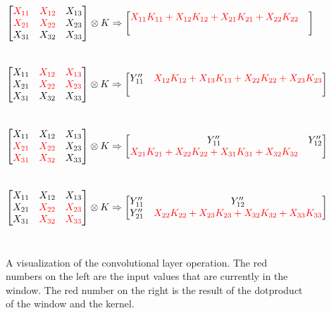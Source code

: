 \begin{figure}
    \centering
    $$\begin{bmatrix}
        \color{red} X_{11} & \color{red} X_{12} & X_{13} \\
        \color{red} X_{21} & \color{red} X_{22} & X_{23} \\
        X_{31} & X_{32} & X_{33} 
    \end{bmatrix} \otimes K \Rightarrow \begin{bmatrix}
        \color{red} X_{11} K_{11} + X_{12} K_{12} + X_{21} K_{21} + X_{22} K_{22} & \\
         &
    \end{bmatrix}$$\\
    $$\begin{bmatrix}
        X_{11} & \color{red} X_{12} & \color{red} X_{13} \\
        X_{21} & \color{red} X_{22} & \color{red} X_{23} \\
        X_{31} & X_{32} & X_{33} 
    \end{bmatrix} \otimes K \Rightarrow \begin{bmatrix}
         Y''_{11} &\color{red} X_{12} K_{12} + X_{13} K_{13} + X_{22} K_{22} + X_{23} K_{23} \\
         &
    \end{bmatrix}$$\\
    $$\begin{bmatrix}
        X_{11} & X_{12} & X_{13} \\
        \color{red} X_{21} & \color{red} X_{22} & X_{23} \\
        \color{red} X_{31} & \color{red} X_{32} & X_{33}
    \end{bmatrix} \otimes K \Rightarrow \begin{bmatrix}
        Y''_{11} & Y''_{12} \\
        \color{red} X_{21} K_{21} + X_{22} K_{22} + X_{31} K_{31} + X_{32} K_{32} & 
    \end{bmatrix}$$\\
    $$\begin{bmatrix}
        X_{11} & X_{12} & X_{13} \\
        X_{21} & \color{red} X_{22} & \color{red} X_{23} \\
        X_{31} & \color{red} X_{32} & \color{red} X_{33}
    \end{bmatrix} \otimes K \Rightarrow \begin{bmatrix}
         Y''_{11} & Y''_{12} \\
         Y''_{21} & \color{red} X_{22} K_{22} + X_{23} K_{23} + X_{32} K_{32} + X_{33} K_{33}
    \end{bmatrix}$$\\
    \caption{A visualization of the convolutional layer operation. The red numbers on the left are the input values that are currently in the window. The red number on the right is the result of the dotproduct of the window and the kernel.}
    \label{fig:conv_operation}
\end{figure}

